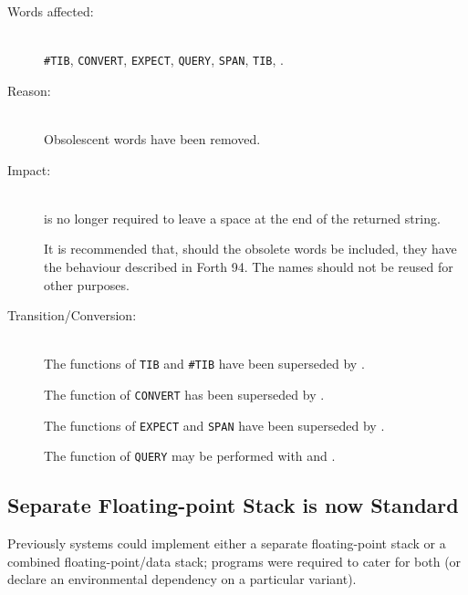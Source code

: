\begin{description}
\item[Words affected:] ~\\
	\texttt{\#TIB},
  	\texttt{CONVERT},
  	\texttt{EXPECT},
  	\texttt{QUERY},
  	\texttt{SPAN},
  	\texttt{TIB},
  	.
  
\item[Reason:] ~\\
	Obsolescent words have been removed.
  
\item[Impact:] ~\\
	 is no longer required to leave a space at the end of
	the returned string.

	It is recommended that, should the obsolete words be included,
	they have the behaviour described in Forth 94.  The names should
	not be reused for other purposes.

\item[Transition/Conversion:] ~\\
	The functions of \texttt{TIB} and \texttt{\#TIB} have been
	superseded by .
 
	The function of \texttt{CONVERT} has been superseded by
	.

	The functions of \texttt{EXPECT} and \texttt{SPAN} have been
	superseded by .

	The function of \texttt{QUERY} may be performed with 
	and .
\end{description}


\subsection{Separate Floating-point Stack is now Standard} %
\label{diff:fpstack}

Previously systems could implement either a separate floating-point
stack or a combined floating-point/data stack; programs were required
to cater for both (or declare an environmental dependency on a
particular variant).

